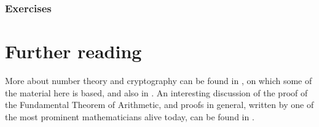 \documentclass{article}
\theoremstyle{plain}
\numberwithin{theorem}{subsection}
\begin{document}
{
\subsubsection*{Exercises}


\section{Further reading}
More about number theory and cryptography can be found in \cite[chapter 1]{DPV06}, on which some of the material here is based, and also in \cite[chapter 9]{LTLM17}. An interesting discussion of the proof of the Fundamental Theorem of Arithmetic, and proofs in general, written by one of the most prominent mathematicians alive today, can be found in \cite{GowArith}. }
\newpage
\end{document}
